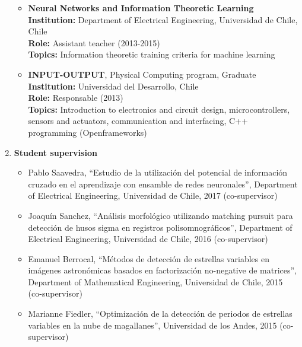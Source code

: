 \documentclass[letterpaper,11pt]{article}
\newcommand{\compactlist}{\setlength{\parskip}{0pt} \setlength{\leftskip}{2em}}
\begin{document}
\begin{enumerate}[I]
\begin{itemize}
        \item \textbf{Neural Networks and Information Theoretic Learning} \\
            \textbf{Institution:} Department of Electrical Engineering, Universidad de Chile, Chile \\
            \textbf{Role:} Assistant teacher (2013-2015) \\
            \textbf{Topics:} Information theoretic training criteria for machine learning %
        \item \textbf{INPUT-OUTPUT}, Physical Computing program, Graduate \\
            \textbf{Institution:} Universidad del Desarrollo, Chile \\
            \textbf{Role:} Responsable (2013) \\
            \textbf{Topics:} Introduction to electronics and circuit design, microcontrollers, sensors and actuators, communication and interfacing, C++ programming (Openframeworks)
 
    	\end{itemize}
        
    \item \textbf{Student supervision}
    \begin{itemize}  \compactlist{}
            
        \item Pablo Saavedra, ``Estudio de la utilizaci\'on del potencial de informaci\'on cruzado en el aprendizaje con ensamble de redes neuronales'', Department of Electrical Engineering, Universidad de Chile, 2017 (co-supervisor)
        \item Joaqu\'in Sanchez, ``An\'alisis morfol\'ogico utilizando matching pursuit para detecci\'on de husos sigma en registros polisomnogr\'aficos'', Department of Electrical Engineering, Universidad de Chile, 2016 (co-supervisor)
		\item Emanuel Berrocal, ``M\'etodos de detecci\'on de estrellas variables en im\'agenes astron\'omicas basados en factorizaci\'on no-negative de matrices'', Department of Mathematical Engineering, Universidad de Chile, 2015 (co-supervisor)
        \item Marianne Fiedler, ``Optimizaci\'on de la detecci\'on de periodos de estrellas variables en la nube de magallanes'', Universidad de los Andes, 2015 (co-supervisor)
		
		\end{itemize}
	

\end{enumerate}
\end{document}
